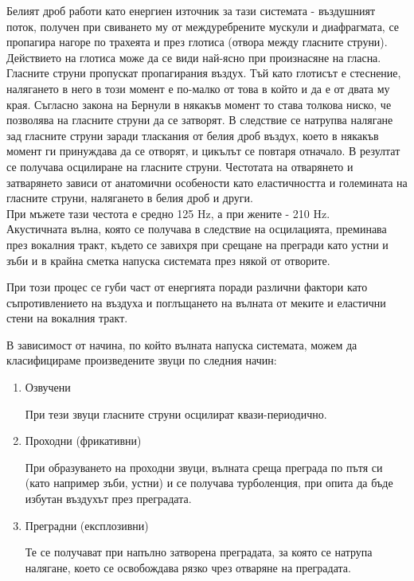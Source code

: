 \documentclass[main.tex]{subfiles}
\begin{document}
    Белият дроб работи като енергиен източник за тази системата - въздушният поток, получен при свиването му от междуребрените мускули и диафрагмата,
    се пропагира нагоре по трахеята и през глотиса (отвора между гласните струни).\\
    Действието на глотиса може да се види най-ясно при произнасяне на гласна. Гласните струни пропускат пропагирания въздух. Тъй като глотисът е стеснение, налягането в него в този момент е по-малко от това в който и да е от двата му края. Съгласно закона на Бернули в някакъв момент то става толкова ниско, че позволява на гласните струни да се затворят. В следствие се натрупва налягане зад гласните струни заради тласкания от белия дроб въздух, което в някакъв момент ги принуждава да се отворят, и цикълът се повтаря отначало. В резултат се получава осцилиране на гласните струни. Честотата на отварянето и затварянето зависи от анатомични особености като еластичността и големината на гласните струни, налягането в белия дроб и други.\\
    При мъжете тази честота е средно 125 Hz, а при жените - 210 Hz.\\
    Акустичната вълна, която се получава в следствие на осцилацията,
    преминава през вокалния тракт, където се завихря при срещане на прегради като устни и зъби и в крайна сметка напуска системата през някой от отворите.

    При този процес се губи част от енергията поради различни фактори като съпротивлението на въздуха и поглъщането на вълната от меките и еластични стени на вокалния тракт.

    В зависимост от начина, по който вълната напуска системата, можем да класифицираме произведените звуци по следния начин:

    \begin{enumerate}
        \item Озвучени

        При тези звуци гласните струни осцилират квази-периодично.
        
        \item Проходни (фрикативни) 
        
        При образуването на проходни звуци, вълната среща преграда по пътя си
        (като например зъби, устни) и се получава турболенция, при опита да бъде избутан въздухът през преградата.
        
        \item Преградни (експлозивни)
        
        Те се получават при напълно затворена преградата, за която се натрупа налягане, което се освобождава рязко чрез отваряне на преградата.
    \end{enumerate}
    
\end{document}
